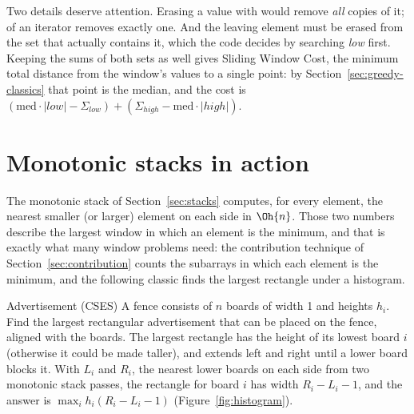 Two details deserve attention. Erasing a value with  would remove \emph{all} copies of it;  of an
iterator removes exactly one. And the leaving element must be erased from the set that actually contains it, which the code
decides by searching \emph{low} first. Keeping the sums of both sets as well gives Sliding Window Cost, the minimum total
distance from the window's values to a single point: by Section~\ref{sec:greedy-classics} that point is the median, and the
cost is $(\text{med} \cdot |low| - \Sigma_{low}) + (\Sigma_{high} - \text{med} \cdot |high|)$.

\section[Monotonic stacks in action]{Monotonic stacks in action \hfill \gold}\label{sec:monostack-apps}

The monotonic stack of Section~\ref{sec:stacks} computes, for every element, the nearest smaller (or larger) element on each
side in $\Oh{n}$. Those two numbers describe the largest window in which an element is the minimum, and that is exactly what
many window problems need: the contribution technique of Section~\ref{sec:contribution} counts the subarrays in which each
element is the minimum, and the following classic finds the largest rectangle under a histogram.

\begin{problem}{Advertisement (CSES)}
A fence consists of $n$ boards of width 1 and heights $h_i$. Find the largest rectangular advertisement that can be placed on
the fence, aligned with the boards.
\solution The largest rectangle has the height of its lowest board $i$ (otherwise it could be made taller), and extends left
and right until a lower board blocks it. With $L_i$ and $R_i$, the nearest lower boards on each side from two monotonic stack
passes, the rectangle for board $i$ has width $R_i - L_i - 1$, and the answer is $\max_i h_i (R_i - L_i - 1)$
(Figure~\ref{fig:histogram}).
\end{problem}

